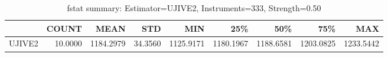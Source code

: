 \begin{table}[ht]
\centering
\caption{fstat summary: Estimator=UJIVE2, Instruments=333, Strength=0.50}
\begin{tabular}{lrrrrrrrr}
\toprule
 & COUNT & MEAN & STD & MIN & 25\% & 50\% & 75\% & MAX \\
\midrule
UJIVE2 & 10.0000 & 1184.2979 & 34.3560 & 1125.9171 & 1180.1967 & 1188.6581 & 1203.0825 & 1233.5442 \\
\bottomrule
\end{tabular}
\end{table}
